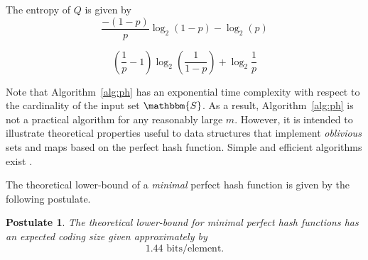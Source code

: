 \documentclass[hidelinks,11pt,final]{article}
\newcommand{\envnumstyle}{section}
\theoremstyle{plain}
\newtheorem{postulate}{Postulate}[\envnumstyle]
\begin{document}
The entropy of $Q$ is given by
\begin{equation}
    \frac{-(1-p)}{p} \log_2(1 - p) - \log_2(p)
\end{equation}

\begin{equation}
    \left(\frac{1}{p}-1\right) \log_2\!\left(\frac{1}{1 - p}\right) + \log_2\frac{1}{p}
\end{equation}


Note that Algorithm~\ref{alg:ph} has an exponential time 
complexity with respect to the cardinality of the input set $\mathbbm{S}$. As a 
result, Algorithm~\ref{alg:ph} is not a practical algorithm for any reasonably large 
$m$. However, it is intended to illustrate theoretical properties useful to 
data structures that implement \emph{oblivious} sets and maps\cite{phf,pmf} 
based on the perfect hash function. Simple and efficient algorithms exist 
\cite{chd,simple}. 

The theoretical lower-bound of a \emph{minimal} perfect hash function is given by the following postulate.
\begin{postulate}
\label{pst:lb}
The theoretical lower-bound for \emph{minimal} perfect hash functions has an expected coding size given approximately by
\begin{equation}
\label{eq:low_bound}
    1.44\text{ bits/element}.
\end{equation}
\end{postulate}
\end{document}
